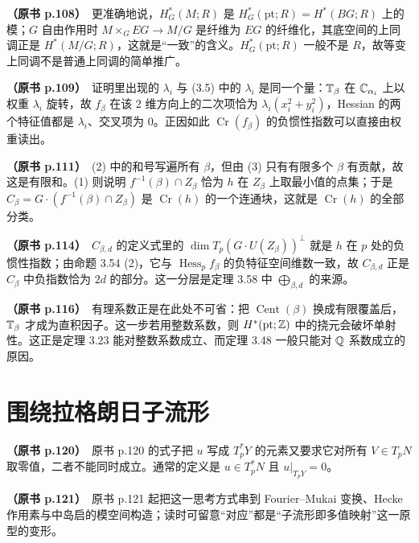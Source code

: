 \noindent \textbf{（原书 p.108）}\ 更准确地说，$H^*_G(M;R)$ 是 $H^*_G(\text{pt};R)=H^*(BG;R)$ 上的模；$G$ 自由作用时 $M\times_GEG\to M/G$ 是纤维为 $EG$ 的纤维化，其底空间的上同调正是 $H^*(M/G;R)$，这就是“一致”的含义。$H^*_G(\text{pt};R)$ 一般不是 $R$，故等变上同调不是普通上同调的简单推广。\par\smallskip

\noindent \textbf{（原书 p.109）}\ 证明里出现的 $\lambda_i$ 与 (3.5) 中的 $\lambda_i$ 是同一个量：$\mathbb{T}_\beta$ 在 $\mathbb{C}_{\alpha_i}$ 上以权重 $\lambda_i$ 旋转，故 $f_\beta$ 在该 2 维方向上的二次项恰为 $\lambda_i(x_i^2+y_i^2)$，Hessian 的两个特征值都是 $\lambda_i$、交叉项为 0。正因如此 $\operatorname{Cr}(f_\beta)$ 的负惯性指数可以直接由权重读出。\par\smallskip

\noindent \textbf{（原书 p.111）}\ (2) 中的和号写遍所有 $\beta$，但由 (3) 只有有限多个 $\beta$ 有贡献，故这是有限和。(1) 则说明 $f^{-1}(\beta)\cap Z_\beta$ 恰为 $h$ 在 $Z_\beta$ 上取最小值的点集；于是 $C_\beta=G\cdot(f^{-1}(\beta)\cap Z_\beta)$ 是 $\operatorname{Cr}(h)$ 的一个连通块，这就是 $\operatorname{Cr}(h)$ 的全部分类。\par\smallskip

\noindent \textbf{（原书 p.114）}\ $C_{\beta,d}$ 的定义式里的 $\dim T_p(G\cdot U(Z_\beta))^{\perp}$ 就是 $h$ 在 $p$ 处的负惯性指数；由命题 3.54 (2)，它与 $\operatorname{Hess}_pf_\beta$ 的负特征空间维数一致，故 $C_{\beta,d}$ 正是 $C_\beta$ 中负指数恰为 $2d$ 的部分。这一分层是定理 3.58 中 $\bigoplus_{\beta,d}$ 的来源。\par\smallskip

\noindent \textbf{（原书 p.116）}\ 有理系数正是在此处不可省：把 $\operatorname{Cent}(\beta)$ 换成有限覆盖后，$\mathbb{T}_\beta$ 才成为直积因子。这一步若用整数系数，则 $H^*(\text{pt};\mathbb{Z})$ 中的挠元会破坏单射性。这正是定理 3.23 能对整数系数成立、而定理 3.48 一般只能对 $\mathbb{Q}$ 系数成立的原因。\par\smallskip

\section*{围绕拉格朗日子流形}

\noindent \textbf{（原书 p.120）}\ 原书 p.120 的式子把 $u$ 写成 $T_p^*Y$ 的元素又要求它对所有 $V\in T_pN$ 取零值，二者不能同时成立。通常的定义是 $u\in T_p^*N$ 且 $u|_{T_pY}=0$。\par\smallskip

\noindent \textbf{（原书 p.121）}\ 原书 p.121 起把这一思考方式串到 Fourier–Mukai 变换、Hecke 作用素与中岛启的模空间构造；读时可留意“对应”都是“子流形即多值映射”这一原型的变形。\par\smallskip

